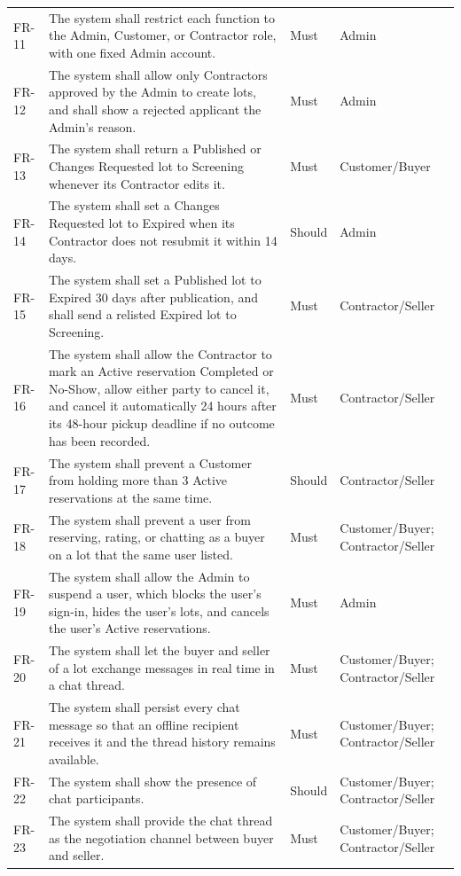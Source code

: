 {\begin{longtable}{@{}p{}p{}p{}p{}@{}}
FR-11 & The system shall restrict each function to the Admin, Customer, or Contractor role, with one fixed Admin account. & Must & Admin \\
FR-12 & The system shall allow only Contractors approved by the Admin to create lots, and shall show a rejected applicant the Admin's reason. & Must & Admin \\
FR-13 & The system shall return a Published or Changes Requested lot to Screening whenever its Contractor edits it. & Must & Customer/Buyer \\
FR-14 & The system shall set a Changes Requested lot to Expired when its Contractor does not resubmit it within 14 days. & Should & Admin \\
FR-15 & The system shall set a Published lot to Expired 30 days after publication, and shall send a relisted Expired lot to Screening. & Must & Contractor/Seller \\
FR-16 & The system shall allow the Contractor to mark an Active reservation Completed or No-Show, allow either party to cancel it, and cancel it automatically 24 hours after its 48-hour pickup deadline if no outcome has been recorded. & Must & Contractor/Seller \\
FR-17 & The system shall prevent a Customer from holding more than 3 Active reservations at the same time. & Should & Contractor/Seller \\
FR-18 & The system shall prevent a user from reserving, rating, or chatting as a buyer on a lot that the same user listed. & Must & Customer/Buyer; Contractor/Seller \\
FR-19 & The system shall allow the Admin to suspend a user, which blocks the user's sign-in, hides the user's lots, and cancels the user's Active reservations. & Must & Admin \\
FR-20 & The system shall let the buyer and seller of a lot exchange messages in real time in a chat thread. & Must & Customer/Buyer; Contractor/Seller \\
FR-21 & The system shall persist every chat message so that an offline recipient receives it and the thread history remains available. & Must & Customer/Buyer; Contractor/Seller \\
FR-22 & The system shall show the presence of chat participants. & Should & Customer/Buyer; Contractor/Seller \\
FR-23 & The system shall provide the chat thread as the negotiation channel between buyer and seller. & Must & Customer/Buyer; Contractor/Seller \\

\end{longtable}}
